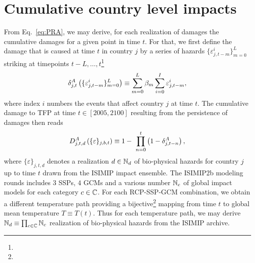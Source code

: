 \documentclass[preprint,3p,authoryear]{elsarticle}
\begin{document}
\section{Cumulative country level impacts}
From Eq.~\eqref{eq:PRA}, we may derive, for each realization of damages the cumulative damages for a given point in time $t$. For that, we first define the damage that is caused at time $t$ in country $j$ by a series of hazards $\lbrace \varepsilon_{j,t-m}^i\rbrace_{m=0}^L$ striking at timepoints $t-L,\ldots,t$\footnote{}   
\begin{equation}
  \label{eq:dA}
  \delta^A_{j,t}\left(\lbrace \varepsilon_{j,t-m}^i\rbrace_{m=0}^L\right)\equiv \sum_{m=0}^L\beta_m\sum_{i=0}^I\varepsilon_{j,t-m}^i,
\end{equation}
where index $i$ numbers the events that affect country $j$ at time $t$. The cumulative damage to TFP at time $t\in[2005,2100]$ resulting from the persistence of damages then reads
\begin{equation}
  \label{eq:dA}
  \DA_{j,t,d}\left(\lbrace \varepsilon\rbrace_{j,b,t}\right)\equiv 1 - \ \prod_{n=0}^{t}\left(1-\dA_{j,t-n}\right),
\end{equation}
where $\lbrace \varepsilon\rbrace_{j,t,d}$ denotes a realization $d\in\mathbb{N}_d$ of bio-physical hazards for country $j$ up to time $t$ drawn from the ISIMIP impact ensemble. The ISIMIP2b modeling rounds includes $3$ SSPs, $4$ GCMs and a various number $\mathbb{N}_c$ of global impact models for each category $c\in\mathbb{C}$. For each RCP-SSP-GCM combination, we obtain a different temperature path providing a bijective\footnote{} mapping from time $t$ to global mean temperature $T\equiv T(t)$. Thus for each temperature path, we may derive $\mathbb{N}_d\equiv \prod_{c\in\mathbb{C}} \mathbb{N}_c$ realization of bio-physical hazards from the ISIMIP archive.
\end{document}
